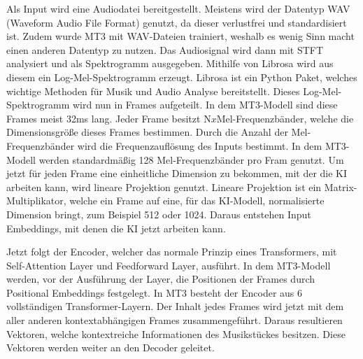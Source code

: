 Als Input wird eine Audiodatei bereitgestellt.
Meistens wird der Datentyp WAV (Waveform Audio File Format) genutzt, da dieser verlustfrei und standardisiert ist.
Zudem wurde MT3 mit WAV-Dateien trainiert, weshalb es wenig Sinn macht einen anderen Datentyp zu nutzen.
Das Audiosignal wird dann mit STFT analysiert und als Spektrogramm ausgegeben.
Mithilfe von Librosa wird aus diesem ein Log-Mel-Spektrogramm erzeugt.
Librosa ist ein Python Paket, welches wichtige Methoden für Musik und Audio Analyse bereitstellt.
Dieses Log-Mel-Spektrogramm wird nun in Frames aufgeteilt.
In dem MT3-Modell sind diese Frames meist 32ms lang.
Jeder Frame besitzt N$x$Mel-Frequenzbänder, welche die Dimensionsgröße dieses Frames bestimmen.
Durch die Anzahl der Mel-Frequenzbänder wird die Frequenzauflösung des Inputs bestimmt.
In dem MT3-Modell werden standardmäßig 128 Mel-Frequenzbänder pro Fram genutzt.
Um jetzt für jeden Frame eine einheitliche Dimension zu bekommen,
mit der die KI arbeiten kann, wird lineare Projektion genutzt.
Lineare Projektion ist ein Matrix-Multiplikator, welche ein Frame auf eine,
für das KI-Modell, normalisierte Dimension bringt, zum Beispiel 512 oder 1024.
Daraus entstehen Input Embeddings, mit denen die KI jetzt arbeiten kann.

Jetzt folgt der Encoder, welcher das normale Prinzip eines Transformers,
mit Self-Attention Layer und Feedforward Layer, ausführt.
In dem MT3-Modell werden, vor der Ausführung der Layer,
die Positionen der Frames durch Positional Embeddings festgelegt.
In MT3 besteht der Encoder aus 6 vollständigen Transformer-Layern.
Der Inhalt jedes Frames wird jetzt mit dem aller anderen kontextabhängigen Frames zusammengeführt.
Daraus resultieren Vektoren, welche kontextreiche Informationen des Musikstückes besitzen.
Diese Vektoren werden weiter an den Decoder geleitet.

